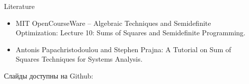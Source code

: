 \documentclass{beamer}
\newcommand{\myqrframe}{
	\begin{frame}
		\centerline{Слайды доступны на Github:}
		\bigskip
		\centerline{\mygit}
		\bigskip
		\myqr
	\end{frame}
}
\begin{document}
\begin{frame}{Literature}
	
	\begin{itemize}
		
		\item MIT OpenCourseWare -- Algebraic Techniques and Semidefinite Optimization:
		{Lecture 10: Sums of Squares and Semidefinite Programming.}
		
		\item Antonis Papachristodoulou and Stephen Prajna:
		{A Tutorial on Sum of Squares Techniques for Systems Analysis.}
		
		
	\end{itemize}
	
\end{frame}


\myqrframe
\end{document}
